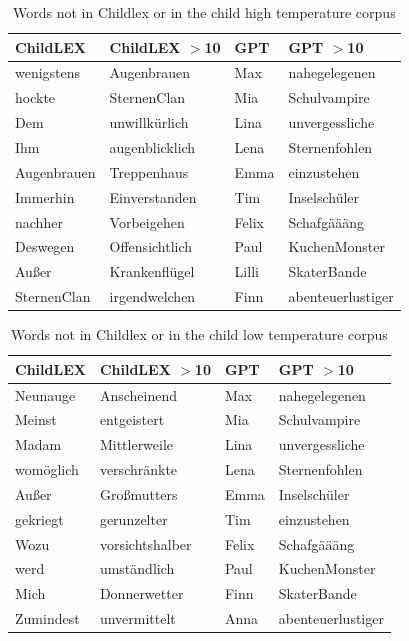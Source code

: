 \documentclass[doc, a4paper]{apa7}
\begin{document}
\begin{table}[!htbp]
\caption{Words not in Childlex or in the child high temperature corpus}
\centering
\begin{tabular}{llll}
  \hline
ChildLEX & ChildLEX $>$10 & GPT & GPT $>$10 \\ 
  \hline
wenigstens & Augenbrauen & Max & nahegelegenen \\ 
  hockte & SternenClan & Mia & Schulvampire \\ 
  Dem & unwillkürlich & Lina & unvergessliche \\ 
  Ihm & augenblicklich & Lena & Sternenfohlen \\ 
  Augenbrauen & Treppenhaus & Emma & einzustehen \\ 
  Immerhin & Einverstanden & Tim & Inselschüler \\ 
  nachher & Vorbeigehen & Felix & Schafgäääng \\ 
  Deswegen & Offensichtlich & Paul & KuchenMonster \\ 
  Außer & Krankenflügel & Lilli & SkaterBande \\ 
  SternenClan & irgendwelchen & Finn & abenteuerlustiger \\ 
   \hline
\end{tabular}
\label{words-chlt}
\end{table}

\begin{table}[!htbp]
\caption{Words not in Childlex or in the child low temperature corpus}
\centering
\begin{tabular}{llll}
  \hline
ChildLEX & ChildLEX $>$10 & GPT & GPT $>$10 \\ 
  \hline
Neunauge & Anscheinend & Max & nahegelegenen \\ 
  Meinst & entgeistert & Mia & Schulvampire \\ 
  Madam & Mittlerweile & Lina & unvergessliche \\ 
  womöglich & verschränkte & Lena & Sternenfohlen \\ 
  Außer & Großmutters & Emma & Inselschüler \\ 
  gekriegt & gerunzelter & Tim & einzustehen \\ 
  Wozu & vorsichtshalber & Felix & Schafgäääng \\ 
  werd & umständlich & Paul & KuchenMonster \\ 
  Mich & Donnerwetter & Finn & SkaterBande \\ 
  Zumindest & unvermittelt & Anna & abenteuerlustiger \\ 
   \hline
\end{tabular}
\label{words-chht}
\end{table}
\end{document}

